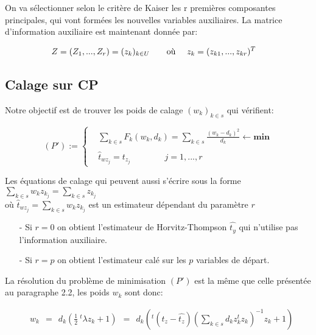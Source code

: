 \documentclass[11pt,fleqn]{book} %
\begin{document}
\vspace{1em}

On va sélectionner selon le critère de Kaiser les r premières composantes principales, qui vont formées les nouvelles variables auxiliaires. La matrice d'information auxiliaire est maintenant donnée par: 

\begin{align*}
& Z=(Z_1,...,Z_r)=(z_k)_{k\in U} \quad\quad \textnormal{où } \quad z_k=(z_{k1},...,z_{kr})^{T} 
\end{align*}

\subsection{Calage sur CP}


Notre objectif est de trouver les poids de calage $(w_k)_{k\in s}$ qui vérifient:

\begin{equation*}
(P') :=\left\{\begin{aligned} & \sum_{k\in s} F_k(w_k,d_k)=\sum_{k\in s} \frac{(w_k-d_k)^2}{d_k} \leftarrow \textbf{min}\\
 \\ & \hat{t}_{wz_j}=t_{z_j}  \quad\quad\quad\quad j=1,...,r \end{aligned}\right.
\end{equation*}

\begin{remark}
Les équations de calage qui peuvent aussi s'écrire sous la forme \:\:
$\sum_{k\in s} w_k z_{k_j}=\sum_{k\in s} z_{k_j}$\\
\: où $ \hat{t}_{wz_j}=\sum_{k\in s} w_k z_{k_j}$ est un estimateur dépendant du paramètre $r$ 

\begin{enumerate}
\item[-]  Si $r=0 $ on obtient l'estimateur de Horvitz-Thompson $\hat{t_y}$ qui n'utilise pas l'information auxiliaire.
\item[-] Si $r=p $ on obtient l'estimateur calé sur les $p$ variables de départ.
\end{enumerate}

\end{remark}


La résolution du problème de minimisation $(P')$ est la même que celle présentée au paragraphe 2.2, les poids $w_k$ sont donc:


\begin{align*}
& w_k\:\:=\:\:d_k\left(\frac{1}{2}\: ^t\lambda z_k +1\right)\:\: = \:\: d_k \left( ^t(t_z-\hat{t_z}) \left( \sum_{k\in s} d_k z_k ^t z_k \right)^{-1} z_k + 1 \right)
\end{align*}
\end{document}

